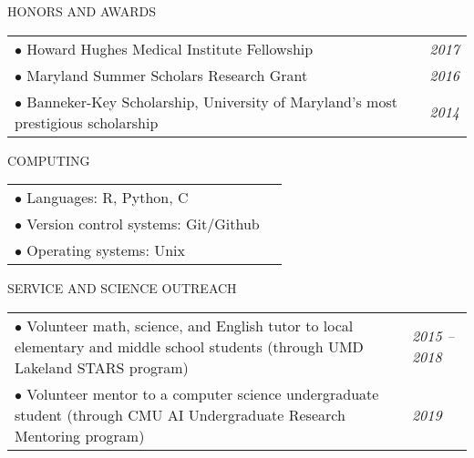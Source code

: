 \documentclass{resume} %
\begin{document}

\begin{rSection}{HONORS AND AWARDS}


\begin{tabular}{p{14cm}R{2.5cm}}
$\bullet$ Howard Hughes Medical Institute Fellowship  &  \it{2017}  \\ 
$\bullet$ Maryland Summer Scholars Research Grant  & \it{2016}  \\ 
$\bullet$ Banneker-Key Scholarship, University of Maryland's most prestigious scholarship & \it{2014}
\end{tabular} 


\end{rSection}

\begin{rSection}{COMPUTING}
	
\begin{tabular}{p{14cm}R{2.5cm}}
$\bullet$ Languages:  R, Python, C  &   \\ 
$\bullet$ Version control systems: Git/Github  &   \\ 
$\bullet$ Operating systems: Unix
\end{tabular} 

\end{rSection}

\begin{rSection}{SERVICE AND SCIENCE OUTREACH}
\begin{tabular}{p{14cm}R{2.5cm}}
$\bullet$ Volunteer math, science, and English tutor to local elementary and middle school students (through UMD Lakeland STARS program) & \it{2015 -- 2018}  \\ 
$\bullet$ Volunteer mentor to a computer science undergraduate student (through CMU AI Undergraduate Research Mentoring program) & \it{2019}  \\ 
\end{tabular} 
\end{rSection}
\end{document}
